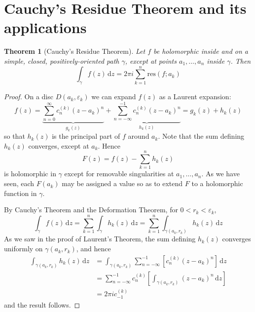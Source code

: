 \documentclass[10pt,fleqn]{article}
\newcommand{\diff}{\,\mathrm{d}}
\newcommand{\eps}{\varepsilon}
\newcommand{\res}{\mathrm{res}}
\theoremstyle{definition} \newtheorem{defn}{Definition}[section]
\theoremstyle{plain}      \newtheorem{thm}[defn]{Theorem}
\theoremstyle{definition} \newtheorem{prop}[defn]{Proposition}
\theoremstyle{plain}      \newtheorem{lem}[defn]{Lemma}
\theoremstyle{definition} \newtheorem{cor}[defn]{Corollary}
\theoremstyle{definition} \newtheorem{ex}[defn]{Example}
\theoremstyle{definition} \newtheorem{rem}[defn]{Remark}
\begin{document}
\section{Cauchy's Residue Theorem and its applications}

\begin{thm}[Cauchy's Residue Theorem]
    Let $f$ be holomorphic inside and on a simple, closed, positively-oriented path $\gamma$, except at points $a_1,\ldots,a_n$ inside $\gamma$.
    Then
    \begin{equation}
        \int_{\gamma} f(z)\diff z=
        2\pi i\sum_{k=1}^n\res(f;a_k)
    \end{equation}
\end{thm}

\begin{proof}
    On a disc $D(a_k,\eps_k)$ we can expand $f(z)$ as a Laurent expansion:
    \[
        f(z)=
        \underbrace{\sum_{n=0}^{\infty}c_n^{(k)}(z-a_k)^n}_{g_k(z)}+
        \underbrace{\sum_{n=-\infty}^{-1}c_n^{(k)}(z-a_k)^n}_{h_k(z)}=
        g_k(z)+h_k(z)
    \]
    so that $h_k(z)$ is the principal part of $f$ around $a_k$.
    Note that the sum defining $h_k(z)$ converges, except at $a_k$.
    Hence
    \[
        F(z)=
        f(z)-\sum_{k=1}^nh_k(z)
    \]
    is holomorphic in $\gamma$ except for removable singularities at $a_1,\ldots,a_n$.
    As we have seen, each $F(a_k)$ may be assigned a value so as to extend $F$ to a holomorphic function in $\gamma$.

    By Cauchy's Theorem and the Deformation Theorem, for $0<r_k<\eps_k$,
    \[
        \int_{\gamma} f(z)\diff z=
        \sum_{k=1}^n\int_{\gamma} h_k(z)\diff z=
        \sum_{k=1}^n\int_{\gamma(a_k,r_k)} h_k(z)\diff z
    \]
    As we saw in the proof of Laurent's Theorem, the sum defining $h_k(z)$ converges uniformly on $\gamma(a_k,r_k)$, and hence
    \begin{align*}
        \int_{\gamma(a_k,r_k)} h_k(z)\diff z
        &=
        \int_{\gamma(a_k,r_k)} \sum_{n=-\infty}^{-1}\left[c_n^{(k)}(z-a_k)^n\right]\diff z\\
        &=
        \sum_{n=-\infty}^{-1}c_n^{(k)}\left[\int_{\gamma(a_k,r_k)} (z-a_k)^n\diff z\right]\\
        &=
        2\pi ic_{-1}^{(k)}
    \end{align*}
    and the result follows.
\end{proof}
\end{document}
